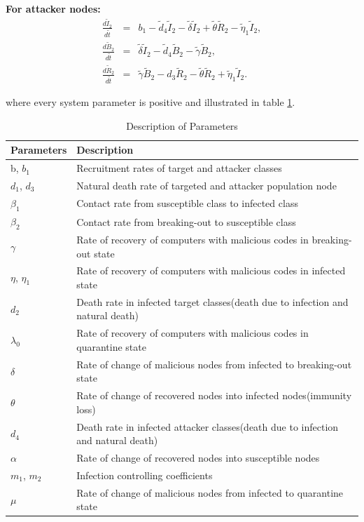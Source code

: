 {\bf For attacker nodes:}
\begin{eqnarray}
 \frac{d \tilde I_2}{d \tilde t} &=& b_1- \tilde d_4 \tilde I_2-\tilde \delta \tilde I_2 +\tilde \theta \tilde R_2 -\tilde\eta_1 \tilde I_2, \\
 \frac{d \tilde B_2}{d \tilde t} &=& \tilde\delta\tilde I_2 -\tilde d_4 \tilde B_2 -\tilde\gamma\tilde B_2 ,\\
\frac{d \tilde R_2}{d \tilde t} &=& \tilde\gamma \tilde B_2 - d_3 \tilde R_2 - \tilde \theta\tilde R_2+\tilde \eta_1\tilde I_2 .
\end{eqnarray}
\par where every system parameter is positive and illustrated in table \ref{table:param1a}.
\begin{table}
\begin{tabular}{|p{3 cm}|p{11 cm}|}
\hline
\bf Parameters & \bf Description \\
\hline
b, $b_1$ & Recruitment rates of target and attacker classes\\
\hline
$d_1$, $d_3$ & Natural death rate of targeted and attacker population node\\
\hline
$\beta_1$ & Contact rate from susceptible class to infected class\\
\hline 
$\beta_2$ & Contact rate from breaking-out to susceptible class\\
\hline
$\gamma$ &Rate of recovery of computers with malicious codes in breaking-out state\\
\hline
$\eta$, $\eta_1$ &Rate of recovery of computers with malicious codes in infected state\\
\hline
$d_2$ &Death rate in infected target classes(death due to infection and natural death)\\
\hline
$\lambda_0$ &Rate of recovery of computers with malicious codes in quarantine state\\
\hline
$\delta$ &Rate of change of malicious nodes from infected to breaking-out state\\
\hline
$\theta$ &Rate of change of recovered nodes into infected nodes(immunity loss)\\
\hline
$d_4$ &Death rate in infected attacker classes(death due to infection and natural death)\\
\hline
$\alpha$ &Rate of change of recovered nodes into susceptible nodes\\
\hline
$m_1$, $m_2$ &Infection controlling coefficients\\
\hline
$\mu$ &Rate of change of malicious nodes from infected to quarantine state\\
\hline
\end{tabular}
\caption {Description of Parameters}
\label{table:param1a}
\end{table}
\clearpage
